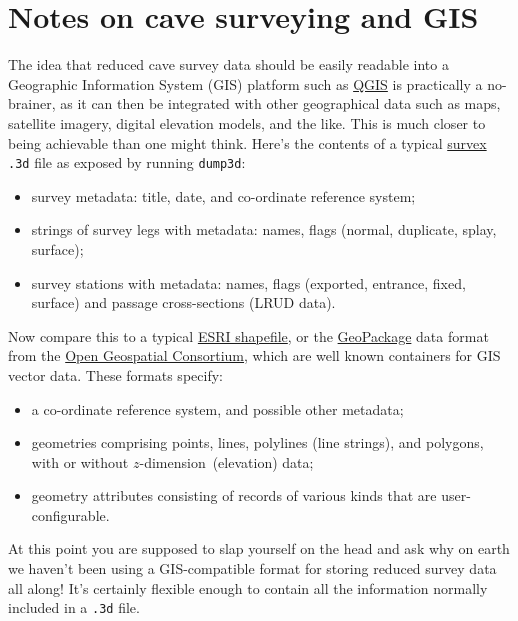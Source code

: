 \documentclass[]{article}
\providecommand{\tightlist}{%
  \setlength{\itemsep}{0pt}\setlength{\parskip}{0pt}}
\newcommand{\zdimension}{$z$-dimension}
\begin{document}
\section{Notes on cave surveying and GIS}

The idea that reduced cave survey data should be easily readable into a
Geographic Information System (GIS) platform such as
\href{http://www.qgis.org/}{QGIS} is practically a no-brainer, as it can
then be integrated with other geographical data such as maps, satellite
imagery, digital elevation models, and the like. This is much closer
to being achievable than one might think. Here's the contents of a
typical \href{https://survex.com/}{survex} \verb}.3d} file as exposed
by running \verb}dump3d}:

\begin{itemize}
\tightlist
\item
  survey metadata: title, date, and co-ordinate reference system;
\item
  strings of survey legs with metadata: names, flags (normal, duplicate,
  splay, surface);
\item
  survey stations with metadata: names, flags (exported, entrance,
  fixed, surface) and passage cross-sections (LRUD data).
\end{itemize}

Now compare this to a typical
\href{https://en.wikipedia.org/wiki/Shapefile}{ESRI shapefile}, or the
\href{https://en.wikipedia.org/wiki/GeoPackage}{GeoPackage} data format
from the
\href{https://en.wikipedia.org/wiki/Open_Geospatial_Consortium}{Open
Geospatial Consortium}, which are well known containers for GIS vector
data. These formats specify:

\begin{itemize}
\tightlist
\item
  a co-ordinate reference system, and possible other metadata;
\item
  geometries comprising points, lines, polylines (line strings), and
  polygons, with or without \zdimension\ (elevation) data;
\item
  geometry attributes consisting of records of various kinds that are
  user-configurable.
\end{itemize}

At this point you are supposed to slap yourself on the head and ask
why on earth we haven't been using a GIS-compatible format for storing
reduced survey data all along!  It's certainly flexible enough
to contain all the information normally included in a \verb}.3d} file.
\end{document}
